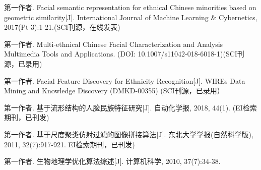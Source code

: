 \begin{resume}


%
%  
%  



  \begin{enumerate}[{[}1{]}]  

\item 第一作者. Facial semantic representation for ethnical Chinese minorities based on geometric similarity[J]. International Journal of Machine Learning \& Cybernetics, 2017(Pt 3):1-21.(SCI刊源，在线发表)
  
  
\item 第一作者. Multi-ethnical Chinese Facial Characterization and Analysis   Multimedia Tools and Applications.  (DOI: 10.1007/s11042-018-6018-1)(SCI刊源，已录用)

\item 第一作者. Facial Feature Discovery for Ethnicity Recognition[J]. WIREs Data Mining and Knowledge Discovery (DMKD-00355) (SCI刊源，已录用）

\item 第一作者.  基于流形结构的人脸民族特征研究[J]. 自动化学报, 2018, 44(1). (EI检索期刊，已刊发)

\item 第一作者.  基于尺度聚类仿射过滤的图像拼接算法[J]. 东北大学学报(自然科学版), 2011, 32(7):917-921. EI检索期刊，已刊发)



\item 第一作者. 生物地理学优化算法综述[J]. 计算机科学, 2010, 37(7):34-38.
    


\end{enumerate}
\end{resume}
